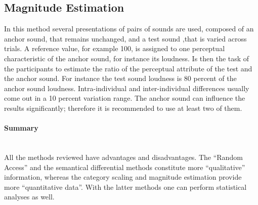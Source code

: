 \subsection{Magnitude Estimation}

In this method several presentations of pairs of sounds are used, composed of an
anchor sound, that remains unchanged, and a test sound ,that is varied across
trials. A reference value, for example 100, is assigned to one perceptual
characteristic of the anchor sound, for instance its loudness. Is then the task
of the participants to estimate the ratio of the perceptual attribute of the
test and the anchor sound. For instance the test sound loudness is 80 percent of
the anchor sound loudness. Intra-individual and inter-individual differences
usually come out in a 10 percent variation range. The anchor sound can influence
the results significantly; therefore it is recommended to use at least two of
them.

\paragraph{Summary} ~\\
All the methods reviewed have advantages and disadvantages. The ``Random
Access'' and the semantical differential methods constitute more ``qualitative''
information, whereas the category scaling and magnitude estimation provide more
``quantitative data''. With the latter methods one can perform statistical 
analyses as well.
